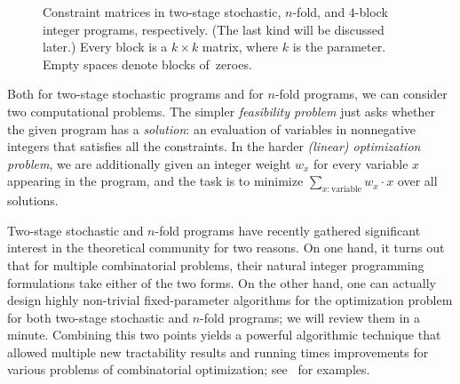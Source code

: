 \documentclass{theoretics}
\begin{document}
\begin{figure}[h]
\centering
{}

    \caption{Constraint matrices in two-stage stochastic, $n$-fold, and $4$-block integer programs, respectively. (The last kind will be discussed later.) Every block is a $k\times k$ matrix, where $k$ is the parameter. Empty spaces denote blocks of~zeroes.}\label{fig:blocks}
\end{figure}

Both for two-stage stochastic programs and for $n$-fold programs, we can consider two computational problems. The simpler {\em{feasibility problem}} just asks whether the given program has a {\em{solution}}: an evaluation of variables in nonnegative integers that satisfies all the constraints. In the harder {\em{(linear) optimization problem}}, we are additionally given an integer weight $w_x$ for every variable $x$ appearing in the program, and the task is to minimize $\sum_{x\colon \text{variable}} w_x\cdot x$ over all solutions.

Two-stage stochastic and $n$-fold programs have recently gathered significant interest in the theoretical community for two reasons. On one hand, it turns out that for multiple combinatorial problems, their natural integer programming formulations take either of the two forms. On the other hand, one can actually design highly non-trivial fixed-parameter algorithms for the optimization problem for both two-stage stochastic and $n$-fold programs; we will review them in a minute. Combining this two points yields a powerful algorithmic technique that allowed multiple new tractability results and running times improvements for various problems of combinatorial optimization; see~\cite{ChenMYZ17,GavenciakKK22,JansenKMR22,KnopK18,KnopK22,KnopKLMO21,KnopKM20,KnopKM20b,KouteckyZ20} for examples.
\end{document}
